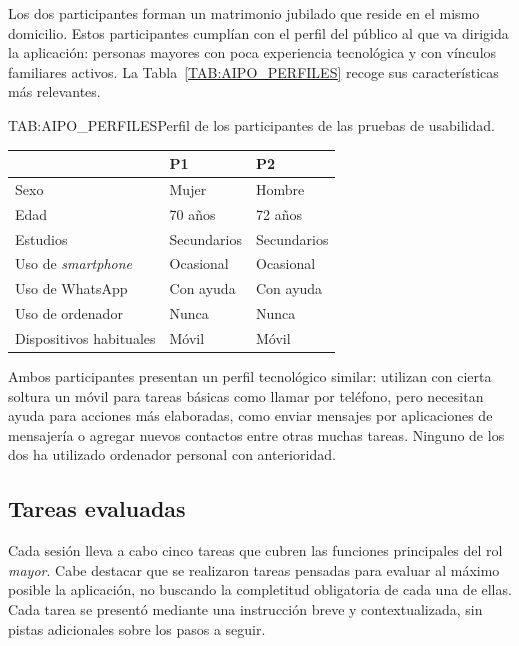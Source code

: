 Los dos participantes forman un matrimonio jubilado que reside en el mismo
domicilio. Estos participantes cumplían con el perfil del público al que va dirigida la aplicación:
personas mayores con poca experiencia tecnológica y con vínculos
familiares activos. La Tabla~\ref{TAB:AIPO_PERFILES} recoge sus
características más relevantes.

\begin{table}[Perfiles de los participantes]{TAB:AIPO_PERFILES}{Perfil de los
participantes de las pruebas de usabilidad.}
\begin{center}
\begin{tabular}{lll}
\toprule
& \textbf{P1} & \textbf{P2} \\
\midrule
Sexo                       & Mujer        & Hombre \\
Edad                       & 70 años      & 72 años \\
Estudios                   & Secundarios  & Secundarios \\
Uso de \emph{smartphone}   & Ocasional    & Ocasional \\
Uso de WhatsApp            & Con ayuda    & Con ayuda \\
Uso de ordenador           & Nunca        & Nunca \\
Dispositivos habituales    & Móvil       & Móvil \\
\bottomrule
\end{tabular}
\end{center}
\end{table}
\FloatBarrier

Ambos participantes presentan un perfil tecnológico similar: utilizan con
cierta soltura un móvil para tareas básicas como llamar por teléfono, pero necesitan ayuda para
acciones más elaboradas, como enviar mensajes por aplicaciones de
mensajería o agregar nuevos contactos entre otras muchas tareas. Ninguno de los dos ha utilizado ordenador personal con
anterioridad.

\subsection{Tareas evaluadas\label{SUB:AIPO_TAREAS}}

Cada sesión lleva a cabo cinco tareas que cubren las funciones
principales del rol \emph{mayor}. Cabe destacar que se realizaron tareas pensadas para evaluar al máximo posible la aplicación, no buscando la completitud obligatoria de cada una de ellas. Cada tarea se presentó mediante una
instrucción breve y contextualizada, sin pistas adicionales sobre los
pasos a seguir.

